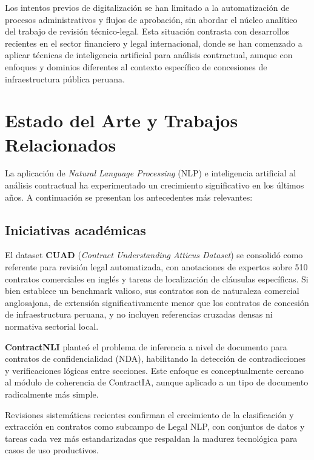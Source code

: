 Los intentos previos de digitalización se han limitado a la automatización de procesos
administrativos y flujos de aprobación, sin abordar el núcleo analítico del trabajo de
revisión técnico-legal. Esta situación contrasta con desarrollos recientes en el sector
financiero y legal internacional, donde se han comenzado a aplicar técnicas de
inteligencia artificial para análisis contractual, aunque con enfoques y dominios
diferentes al contexto específico de concesiones de infraestructura pública peruana.

\section{Estado del Arte y Trabajos Relacionados}

La aplicación de \textit{Natural Language Processing} (NLP) e inteligencia artificial
al análisis contractual ha experimentado un crecimiento significativo en los últimos
años. A continuación se presentan los antecedentes más relevantes:

\subsection{Iniciativas académicas}

El dataset \textbf{CUAD} (\textit{Contract Understanding Atticus Dataset})
\cite{hendrycks2021cuad} se consolidó como referente para revisión legal automatizada,
con anotaciones de expertos sobre 510 contratos comerciales en inglés y tareas de
localización de cláusulas específicas. Si bien establece un benchmark valioso,
sus contratos son de naturaleza comercial anglosajona, de extensión significativamente
menor que los contratos de concesión de infraestructura peruana, y no incluyen
referencias cruzadas densas ni normativa sectorial local.

\textbf{ContractNLI} \cite{koreeda2021contractnli} planteó el problema de inferencia
a nivel de documento para contratos de confidencialidad (NDA), habilitando la
detección de contradicciones y verificaciones lógicas entre secciones. Este enfoque
es conceptualmente cercano al módulo de coherencia de ContractIA, aunque aplicado
a un tipo de documento radicalmente más simple.

Revisiones sistemáticas recientes \cite{singh2025survey} confirman el crecimiento
de la clasificación y extracción en contratos como subcampo de Legal NLP, con
conjuntos de datos y tareas cada vez más estandarizadas que respaldan la madurez
tecnológica para casos de uso productivos.

